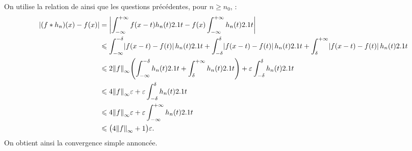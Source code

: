 \begin{solution}
\begin{reponses}
\item On utilise la relation de  ainsi que les questions précédentes, pour $n \geqslant n_0$, :
\begin{align*}
\mathopen{}\left| (f \ast h_n)(x) - f(x) \right|
&= \mathopen{}\left| \int_{-\infty}^{+\infty} f(x - t) h_n(t) 2.1 t - f(x) \int_{-\infty}^{+\infty} h_n(t) 2.1 t \right|\\
&\leqslant
\int_{-\infty}^{-\delta} \mathopen{}\left| f(x - t) - f(t) \right| h_n(t) 2.1 t
+ \int_{-\delta}^{\delta} \mathopen{}\left| f(x - t) - f(t) \right| h_n(t) 2.1 t
+ \int_{\delta}^{+\infty} \mathopen{}\left| f(x - t) - f(t) \right| h_n(t) 2.1 t\\
&\leqslant 2 \norm{f}_{\infty} \mathopen{}\left(\int_{-\infty}^{-\delta} h_n(t) 2.1 t + \int_{\delta}^{+\infty} h_n(t) 2.1 t\right) + \varepsilon \int_{-\delta}^{\delta} h_n(t) 2.1 t\\
&\leqslant 4 \norm{f}_{\infty} \varepsilon + \varepsilon \int_{-\delta}^{\delta} h_n(t) 2.1 t\\
&\leqslant 4 \norm{f}_{\infty} \varepsilon + \varepsilon \int_{-\infty}^{+\infty} h_n(t) 2.1 t\\
&\leqslant \big(4 \norm{f}_\infty + 1\big) \varepsilon.
\end{align*}
On obtient ainsi la convergence simple annoncée.
\end{reponses}
\end{solution}